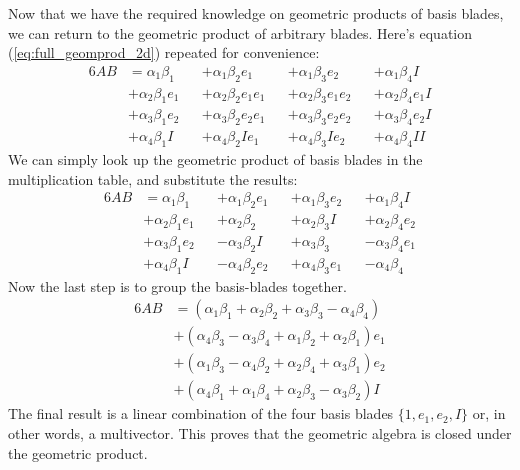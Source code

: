 \documentclass[10pt]{report}
\begin{document}
Now that we have the required knowledge on geometric products of
basis blades, we can return to the geometric product of arbitrary
blades. Here's equation (\ref{eq:full_geomprod_2d}) repeated for
convenience:
\begin{alignat}{6}
    AB &= \alpha_1 \beta_1     &&+\alpha_1 \beta_2      e_1 &&+ \alpha_1 \beta_3     e_2 &&+ \alpha_1 \beta_4     I \nonumber\\
       &+ \alpha_2 \beta_1 e_1 &&+\alpha_2 \beta_2  e_1 e_1 &&+ \alpha_2 \beta_3 e_1 e_2 &&+ \alpha_2 \beta_4 e_1 I \nonumber\\
       &+ \alpha_3 \beta_1 e_2 &&+\alpha_3 \beta_2  e_2 e_1 &&+ \alpha_3 \beta_3 e_2 e_2 &&+ \alpha_3 \beta_4 e_2 I \nonumber\\
       &+ \alpha_4 \beta_1 I   &&+\alpha_4 \beta_2  I   e_1 &&+ \alpha_4 \beta_3 I   e_2 &&+ \alpha_4 \beta_4 I   I \nonumber
\end{alignat}
We can simply look up the geometric product of basis blades in the
multiplication table, and substitute the results:
\begin{alignat}{6}
    AB &= \alpha_1 \beta_1     &&+\alpha_1 \beta_2  e_1 &&+ \alpha_1 \beta_3 e_2    &&+ \alpha_1 \beta_4 I      \nonumber\\
       &+ \alpha_2 \beta_1 e_1 &&+\alpha_2 \beta_2      &&+ \alpha_2 \beta_3 I      &&+ \alpha_2 \beta_4 e_2    \nonumber\\
       &+ \alpha_3 \beta_1 e_2 &&-\alpha_3 \beta_2  I   &&+ \alpha_3 \beta_3        &&- \alpha_3 \beta_4 e_1    \nonumber\\
       &+ \alpha_4 \beta_1 I   &&-\alpha_4 \beta_2  e_2 &&+ \alpha_4 \beta_3 e_1    &&- \alpha_4 \beta_4        \nonumber
\end{alignat}
Now the last step is to group the basis-blades together.
\begin{alignat}{6}
    \label{eq:geom prod 2d multivector}
    AB &= (\alpha_1 \beta_1 + \alpha_2 \beta_2 + \alpha_3 \beta_3 - \alpha_4 \beta_4)              \\
       &+ (\alpha_4 \beta_3 - \alpha_3 \beta_4 + \alpha_1 \beta_2 + \alpha_2 \beta_1) e_1 \nonumber\\
       &+ (\alpha_1 \beta_3 - \alpha_4 \beta_2 + \alpha_2 \beta_4 + \alpha_3 \beta_1) e_2 \nonumber\\
       &+ (\alpha_4 \beta_1 + \alpha_1 \beta_4 + \alpha_2 \beta_3 - \alpha_3 \beta_2) I   \nonumber
\end{alignat}
The final result is a linear combination of the four basis blades
$\{1, e_1, e_2, I\}$ or, in other words, a multivector. This
proves that the geometric algebra is closed under the geometric
product.
\end{document}
